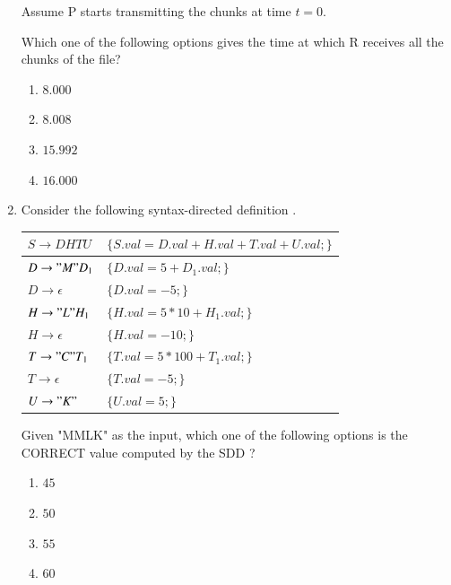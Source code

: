 \documentclass[a4paper, 11pt]{article}
\begin{document}
\begin{enumerate}
    Assume P starts transmitting the chunks at time $t=0$.
    
    Which one of the following options gives the time  at which R receives all the chunks of the file?
    \begin{enumerate}
        \item $8.000$
        \item $8.008$
        \item $15.992$
        \item $16.000$
    \end{enumerate}
    \hfill{}

    \item Consider the following syntax-directed definition .
    
    \begin{tabularx}{\textwidth}{|l|X|}
        \hline
        $S \rightarrow DHTU$ & $\{S.val = D.val + H.val + T.val + U.val;\}$ \\
        \hline
        $D \rightarrow "M" D_1$ & $\{D.val = 5 + D_1.val;\}$ \\
        \hline
        $D \rightarrow \epsilon$ & $\{D.val = -5;\}$ \\
        \hline
        $H \rightarrow "L" H_1$ & $\{H.val = 5*10 + H_1.val;\}$ \\
        \hline
        $H \rightarrow \epsilon$ & $\{H.val = -10;\}$ \\
        \hline
        $T \rightarrow "C" T_1$ & $\{T.val = 5*100 + T_1.val;\}$ \\
        \hline
        $T \rightarrow \epsilon$ & $\{T.val = -5;\}$ \\
        \hline
        $U \rightarrow "K"$ & $\{U.val = 5;\}$ \\
        \hline
    \end{tabularx}
    
    Given "MMLK" as the input, which one of the following options is the CORRECT value computed by the SDD ?
    
    \begin{enumerate}
        \item $45$
        \item $50$
        \item $55$
        \item $60$
    \end{enumerate}
    \hfill{}


\end{enumerate}
\end{document}
